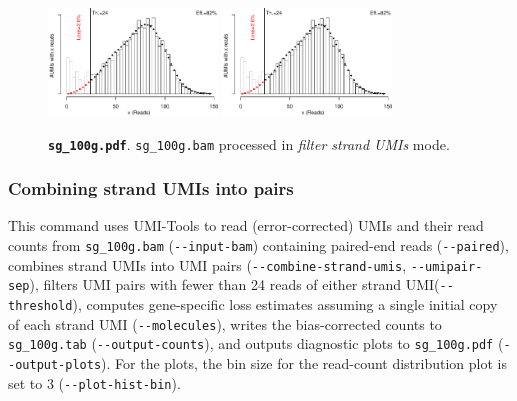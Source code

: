 \documentclass{scrartcl}
\newcommand{\shellscript}[1]{\bgroup\topsep=0pt\partopsep=0pt\shaded%
	\endshaded\egroup}
\newcommand{\ddarg}[1]{\texttt{-{}-#1}}
\begin{document}
\begin{figure}[H]
{\centering
\includegraphics[width=0.4\textwidth,page=1]{../examples/sg_100g.pdf}\hfill
\includegraphics[width=0.4\textwidth,page=2]{../examples/sg_100g.pdf}
\\}
\caption*{\textbf{\texttt{sg\_100g.pdf}}. \texttt{sg\_100g.bam} processed in \emph{filter strand UMIs} mode.}
\end{figure}

\subsubsection*{Combining strand UMIs into pairs}

\shellscript{../examples/sg_100g_comb.cmd}

\enlargethispage{5\baselineskip}
\begin{sloppypar}
This command uses UMI-Tools to read (error-corrected) UMIs and their read counts from \texttt{sg\_100g.bam} (\ddarg{input-bam}) containing paired-end reads (\ddarg{paired}), combines strand UMIs into UMI pairs (\ddarg{combine-strand-umis}, \ddarg{umipair-sep}), filters UMI pairs with fewer than 24 reads of either strand UMI(\ddarg{threshold}), computes gene-specific loss estimates assuming a single initial copy of each strand UMI (\ddarg{molecules}), writes the bias-corrected counts to \texttt{sg\_100g.tab} (\ddarg{output-counts}), and outputs diagnostic plots to \texttt{sg\_100g.pdf} (\ddarg{output-plots}). For the plots, the bin size for the read-count distribution plot is set to 3 (\ddarg{plot-hist-bin}).
\end{sloppypar}
\end{document}
